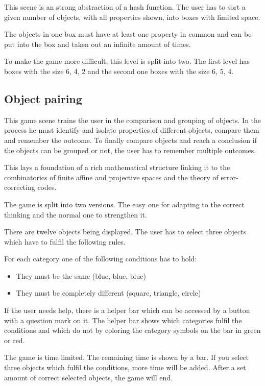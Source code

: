 This scene is an strong abstraction of a hash function.
The user has to sort a given number of objects, with all properties shown, into boxes with limited space.

The objects in one box must have at least one property in common and
can be put into the box and taken out an infinite amount of times.

To make the game more difficult, this level is split into two.
The first level has boxes with the size 6, 4, 2 and the second one boxes with the size 6, 5, 4.

\subsection{Object pairing}\label{subsec:object-pairing}
This game scene trains the user in the comparison and grouping of objects.
In the process he must identify and isolate properties of different objects, compare them and remember the outcome.
To finally compare objects and reach a conclusion if the objects can be grouped or not,
the user has to remember multiple outcomes.

This lays a foundation of a rich mathematical structure linking it to the combinatorics of finite affine and
projective spaces and the theory of error-correcting codes.\cite{cardgameset}

The game is split into two versions. The easy one for adapting to the correct thinking
and the normal one to strengthen it.

There are twelve objects being displayed.
The user has to select three objects which have to fulfil the following rules.

For each category one of the following conditions has to hold:
\begin{itemize}
    \item They must be the same (blue, blue, blue)
    \item They must be completely different (square, triangle, circle)
\end{itemize}

If the user needs help, there is a helper bar which can be accessed by a button with a question mark on it.
The helper bar shows which categories fulfil the conditions and which do not
by coloring the category symbols on the bar in green or red.

The game is time limited. The remaining time is shown by a bar.
If you select three objects which fulfil the conditions, more time will be added.
After a set amount of correct selected objects, the game will end.

